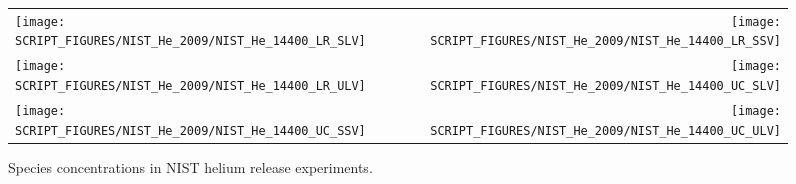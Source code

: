 \begin{figure}[h!]
\begin{tabular*}{\textwidth}{l@{\extracolsep{\fill}}r}
\texttt{[image: SCRIPT\_FIGURES/NIST\_He\_2009/NIST\_He\_14400\_LR\_SLV]} &
\texttt{[image: SCRIPT\_FIGURES/NIST\_He\_2009/NIST\_He\_14400\_LR\_SSV]} \\
\texttt{[image: SCRIPT\_FIGURES/NIST\_He\_2009/NIST\_He\_14400\_LR\_ULV]} &
\texttt{[image: SCRIPT\_FIGURES/NIST\_He\_2009/NIST\_He\_14400\_UC\_SLV]} \\
\texttt{[image: SCRIPT\_FIGURES/NIST\_He\_2009/NIST\_He\_14400\_UC\_SSV]} &
\texttt{[image: SCRIPT\_FIGURES/NIST\_He\_2009/NIST\_He\_14400\_UC\_ULV]} 
\end{tabular*}
\caption[Species concentrations in NIST helium release experiments]{Species concentrations in NIST helium release experiments.}
\label{NIST_Hydrogen_Species_3}
\end{figure}

\clearpage

